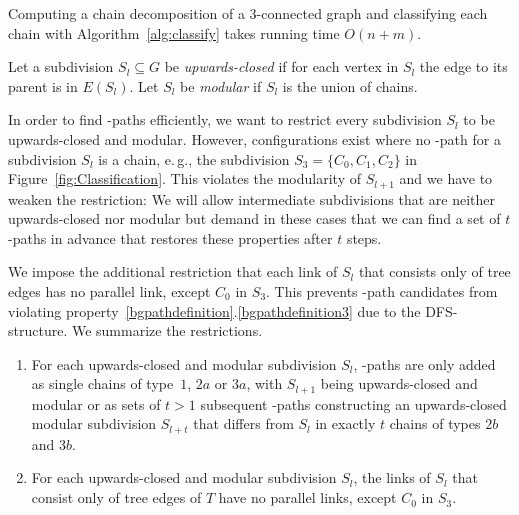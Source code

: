 \begin{lemma}\label{ChainDecomposition}
Computing a chain decomposition of a $3$-connected graph and classifying each chain with Algorithm~\ref{alg:classify} takes running time $O(n+m)$.
\end{lemma}


\begin{definition}\label{upwardsclosed}
Let a subdivision $S_l \subseteq G$ be \emph{upwards-closed} if for each vertex in $S_l$ the edge to its parent is in $E(S_l)$. Let $S_l$ be \emph{modular} if $S_l$ is the union of chains.
\end{definition}

In order to find \BG-paths efficiently, we want to restrict every subdivision $S_l$ to be upwards-closed and modular. However, configurations exist where no \BG-path for a subdivision $S_l$ is a chain, e.\,g., the subdivision $S_3 = \{C_0,C_1,C_2\}$ in Figure~\ref{fig:Classification}. This violates the modularity of $S_{l+1}$ and we have to weaken the restriction: We will allow intermediate subdivisions that are neither upwards-closed nor modular but demand in these cases that we can find a set of $t$ \BG-paths in advance that restores these properties after $t$ steps.







We impose the additional restriction that each link of $S_l$ that consists only of tree edges has no parallel link, except $C_0$ in $S_3$. This prevents \BG-path candidates from violating property~\ref{bgpathdefinition}.\ref{bgpathdefinition3} due to the DFS-structure. We summarize the restrictions.


\begin{enumerate}[label=($R_\arabic*$), leftmargin=*]
	\item For each upwards-closed and modular subdivision $S_l$, \BG-paths are only added as\label{R1} single chains of type~$1$, $2a$ or $3a$, with $S_{l+1}$ being upwards-closed and modular or as sets of $t > 1$ subsequent \BG-paths constructing an upwards-closed modular subdivision $S_{l+t}$ that differs from $S_l$ in exactly $t$ chains of types $2b$ and $3b$.
\item For each upwards-closed and modular subdivision $S_l$, the links of $S_l$ that consist only of tree edges of $T$ have no parallel links, except $C_0$ in $S_3$.\label{R2}
\end{enumerate}



